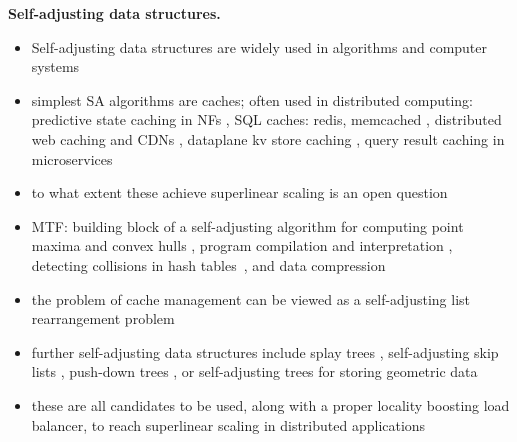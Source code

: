 \noindent%
\textbf{Self-adjusting data structures.} %
\begin{itemize}
\item Self-adjusting data structures are widely used in algorithms and computer systems
\item simplest SA algorithms are caches; often used in distributed computing: predictive state caching in NFs \cite{295537}, SQL caches: redis, memcached \cite{10.5555/1012889.1012894, 180324}, distributed web caching and CDNs \cite{295603}, dataplane kv store caching \cite{ghigoff2021bmc}, query result caching in microservices \cite{295493}
\item to what extent these achieve superlinear scaling is an open question
\item MTF: building block of a self-adjusting algorithm for computing point maxima and convex hulls \cite{BentleyCL93}, program compilation and interpretation \cite{HesterH85}, detecting collisions in hash tables~\cite{HesterH85}, and data compression \cite{BentleySTW86}
\item the problem of cache management can be viewed as a self-adjusting list rearrangement problem \cite{SleatorT85}
\item further self-adjusting data structures include splay trees \cite{SleatorT85Splay}, self-adjusting skip lists \cite{BoseDL08}, push-down trees \cite{Avin0020}, or self-adjusting trees for storing geometric data \cite{ParkM12}
\item these are all candidates to be used, along with a proper locality boosting load balancer, to reach superlinear scaling in distributed applications
\end{itemize}

